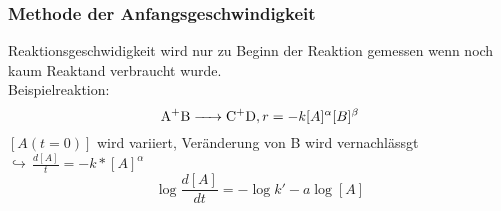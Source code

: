 \documentclass[a4paper, fleqn]{article}
\begin{document}
\subsubsection{Methode der Anfangsgeschwindigkeit}
Reaktionsgeschwidigkeit wird nur zu Beginn der Reaktion gemessen wenn noch kaum Reaktand verbraucht wurde.\\
Beispielreaktion:\\
\begin{equation*}
    \ce{A+B -> C+D}, r = -k[A]^\alpha[B]^\beta
\end{equation*}
$[A(t=0)]$ wird variiert, Veränderung von B wird vernachlässgt\\
$\hookrightarrow\, \frac{d[A]}{t} = -k*[A]^\alpha$\\
\begin{equation*}
    \log \frac{d[A]}{dt} = -\log k' - a \log [A]
\end{equation*} 
\end{document}
